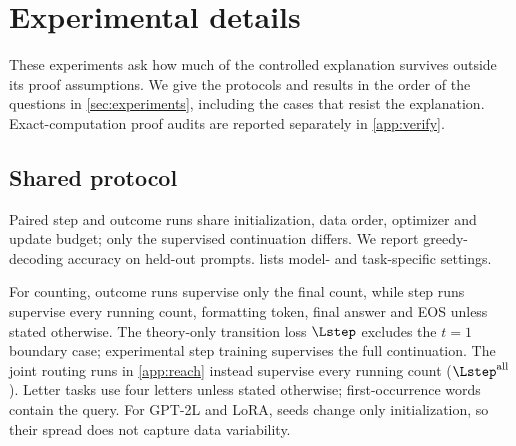 \section{Experimental details}
\label{app:experiments}
\label{app:experimental-details}
These experiments ask how much of the controlled explanation survives outside its proof assumptions. We give the protocols and
results in the order of the questions in \cref{sec:experiments}, including the cases that resist the explanation. Exact-computation
proof audits are reported separately in \cref{app:verify}.

\subsection{Shared protocol}
\label{app:letter-protocol}
Paired step and outcome runs share initialization, data order, optimizer and update budget; only the supervised continuation differs.
We report greedy-decoding accuracy on held-out prompts.  lists model- and task-specific settings.

\begin{table}[H]
\centering\small
{}
\caption{\textbf{Shared experimental settings.} Task-specific exceptions are stated in the corresponding subsections.}
\label{tab:protocol}
\end{table}

For counting, outcome runs supervise only the final count, while step runs supervise every running count, formatting token,
final answer and EOS unless stated otherwise. The theory-only transition loss $\Lstep$ excludes the $t=1$ boundary case;
experimental step training supervises the full continuation. The joint routing runs in \cref{app:reach} instead supervise
every running count ($\Lstep^{\mathrm{all}}$). Letter tasks use four letters unless stated otherwise; first-occurrence words contain the query.
For GPT-2L and LoRA, seeds change only initialization, so their spread does not capture data variability.

